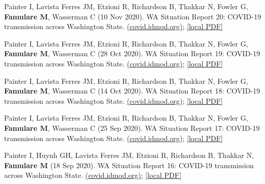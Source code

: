 \documentclass{article}
\begin{document}
\begin{llist}
\begin{items}
	\item[{[39]}] Painter I, Lavista Ferres JM, Etzioni R, Richardson B, Thakkar N, Fowler G, \textbf{Famulare M}, Wasserman C (10 Nov 2020). WA Situation Report 20: COVID-19 transmission across Washington State. \href{https://iazpvnewgrp01.blob.core.windows.net/source/2021-02/reports/pdf/WA_Situation_Report_20_COVID-19_transmission_across_Washington_State.pdf}{(covid.idmod.org)}; \href{https://famulare.github.io/assets/publication-mirror/WA_Situation_Report_20_COVID-19_transmission_across_Washington_State.pdf}{[local PDF]}
	
	\item[{[38]}] Painter I, Lavista Ferres JM, Etzioni R, Richardson B, Thakkar N, Fowler G, \textbf{Famulare M}, Wasserman C (28 Oct 2020). WA Situation Report 19: COVID-19 transmission across Washington State. \href{https://iazpvnewgrp01.blob.core.windows.net/source/2021-02/reports/pdf/WA_Situation_Report_19_COVID-19_transmission_across_Washington_State.pdf}{(covid.idmod.org)}; \href{https://famulare.github.io/assets/publication-mirror/WA_Situation_Report_19_COVID-19_transmission_across_Washington_State.pdf}{[local PDF]}
	
	\item[{[37]}] Painter I, Lavista Ferres JM, Etzioni R, Richardson B, Thakkar N, Fowler G, \textbf{Famulare M}, Wasserman C (14 Oct 2020). WA Situation Report 18: COVID-19 transmission across Washington State. \href{https://iazpvnewgrp01.blob.core.windows.net/source/2021-02/reports/pdf/WA_Situation_Report_18_COVID-19_transmission_across_Washington_State.pdf}{(covid.idmod.org)}; \href{https://famulare.github.io/assets/publication-mirror/WA_Situation_Report_18_COVID-19_transmission_across_Washington_State.pdf}{[local PDF]}
	
	
	\item[{[36]}] Painter I, Lavista Ferres JM, Etzioni R, Richardson B, Thakkar N, Fowler G, \textbf{Famulare M}, Wasserman C (25 Sep 2020). WA Situation Report 17: COVID-19 transmission across Washington State. \href{https://iazpvnewgrp01.blob.core.windows.net/source/2021-02/reports/pdf/WA_Situation_Report_17_COVID-19_transmission_across_Washington_State.pdf}{(covid.idmod.org)}; \href{https://famulare.github.io/assets/publication-mirror/WA_Situation_Report_17_COVID-19_transmission_across_Washington_State.pdf}{[local PDF]}
	
	\item[{[35]}] Painter I,  Huynh GH, Lavista Ferres JM, Etzioni R, Richardson B, Thakkar N,  \textbf{Famulare M} (18 Sep 2020). WA Situation Report 16: COVID-19 transmission across Washington State. \href{https://iazpvnewgrp01.blob.core.windows.net/source/2021-02/reports/pdf/WA_Situation_Report_16_COVID-19_transmission_across_Washington_State.pdf}{(covid.idmod.org)}; \href{https://famulare.github.io/assets/publication-mirror/WA_Situation_Report_16_COVID-19_transmission_across_Washington_State.pdf}{[local PDF]}
	

\end{items}
\end{llist}
\end{document}
